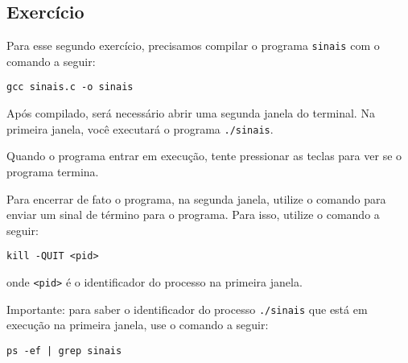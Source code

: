 

\subsection{Exercício}
 
 Para esse segundo exercício, precisamos compilar o programa \texttt{sinais} com o comando a seguir:
 
\begin{lstlisting}[style=MyBashStyle]
gcc sinais.c -o sinais 
\end{lstlisting}

Após compilado, será necessário abrir uma segunda janela do terminal. Na primeira janela, você executará o programa \texttt{./sinais}. 

Quando o programa entrar em execução, tente pressionar as teclas  para ver se o programa termina.

Para encerrar de fato o programa, na segunda janela, utilize o comando  para enviar um sinal de término para o programa. Para isso, utilize o comando a seguir:

\begin{lstlisting}[style=MyBashStyle]
kill -QUIT <pid>
\end{lstlisting}

\noindent onde \texttt{<pid>} é o identificador do processo na primeira janela.

Importante: para saber o identificador do processo \texttt{./sinais} que está em execução na primeira janela, use o comando a seguir:

\begin{lstlisting}[style=MyBashStyle]
ps -ef | grep sinais
\end{lstlisting}
